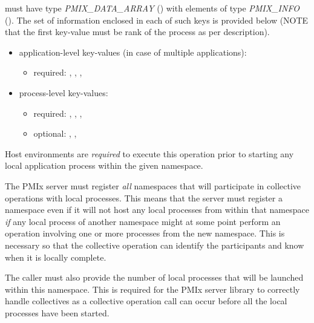 \begin{itemize}
           must have type \emph{PMIX_DATA_ARRAY} () with elements of type \emph{PMIX_INFO} ().
          The set of information enclosed in each of such keys is provided below (NOTE that the first key-value must be rank of the process as per  description).
    \begin{itemize}
        \item application-level key-values (in case of multiple applications):
        \begin{itemize}
            \item required: , , , 
        \end{itemize}
        \item process-level key-values:
        \begin{itemize}
            \item required: , , , 
            \item optional: , , 
        \end{itemize}
    \end{itemize}
\end{itemize}

\advicermstart
Host environments are \textit{required} to execute this operation prior to starting any local application process within the given namespace.

The \ac{PMIx} server must register \emph{all} namespaces that will participate in collective operations with local processes.
This means that the server must register a namespace even if it will not host any local processes from within that namespace \emph{if} any local process of another namespace might at some point perform an operation involving one or more processes from the new namespace.
This is necessary so that the collective operation can identify the participants and know when it is locally complete.

The caller must also provide the number of local processes that will be launched within this namespace.
This is required for the \ac{PMIx} server library to correctly handle collectives as a collective operation call can occur before all the local processes have been started.
\advicermend


